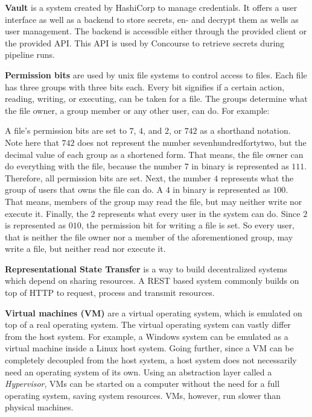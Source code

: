 \textbf{Vault}\cite{vault} is a system created by HashiCorp to manage credentials.
It offers a user interface as well as a backend to store secrets, en- and decrypt them as wells as user management.
The backend is accessible either through the provided client or the provided API.
This API is used by Concourse to retrieve secrets during pipeline runs.

\textbf{Permission bits}\cite{unix-file-permissions} are used by unix file systems to control access to files.
Each file has three groups with three bits each.
Every bit signifies if a certain action, reading, writing, or executing, can be taken for a file.
The groups determine what the file owner, a group member or any other user, can do.
For example:

A file's permission bits are set to $7$, $4$, and $2$, or $742$ as a shorthand notation.
Note here that $742$ does not represent the number sevenhundredfortytwo, but the decimal value of each group as a shortened form.
That means, the file owner can do everything with the file, because the number $7$ in binary is represented as $111$.
Therefore, all permission bits are set.
Next, the number $4$ represents what the group of users that owns the file can do.
A $4$ in binary is represented as $100$.
That means, members of the group may read the file, but may neither write nor execute it.
Finally, the $2$ represents what every user in the system can do.
Since $2$ is represented as $010$, the permission bit for writing a file is set.
So every user, that is neither the file owner nor a member of the aforementioned group, may write a file, but neither read nor execute it.

\textbf{Representational State Transfer}\cite{extending-representation-state-transfer} is a way to build decentralized systems which depend on sharing resources.
A REST based system commonly builds on top of HTTP to request, process and transmit resources.

\textbf{Virtual machines (VM)}\cite{what-is-a-virtual-machine} are a virtual operating system, which is emulated on top of a real operating system.
The virtual operating system can vastly differ from the host system.
For example, a Windows system can be emulated as a virtual machine inside a Linux host system.
Going further, since a VM can be completely decoupled from the host system, a host system does not necessarily need an operating system of its own.
Using an abstraction layer called a \textit{Hypervisor}, VMs can be started on a computer without the need for a full operating system, saving system resources.
VMs, however, run slower than physical machines.
